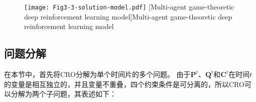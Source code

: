 \begin{figure}[h]
\centering
  \texttt{[image: Fig3-3-solution-model.pdf]}
  [Multi-agent game-theoretic deep reinforcement learning model]{Multi-agent game-theoretic deep reinforcement learning model}
  \label{fig 3-3}
\end{figure} 

\subsection{问题分解}
在本节中，首先将CRO分解为单个时间片的多个问题。
由于$\mathbf{P}^{t}$、$\mathbf{Q}^{t}$和$\mathbf{C}^{t}$在时间$t$的变量是相互独立的，并且变量不重叠，四个约束条件是可分离的，所以CRO可以分解为两个子问题，其表述如下：

